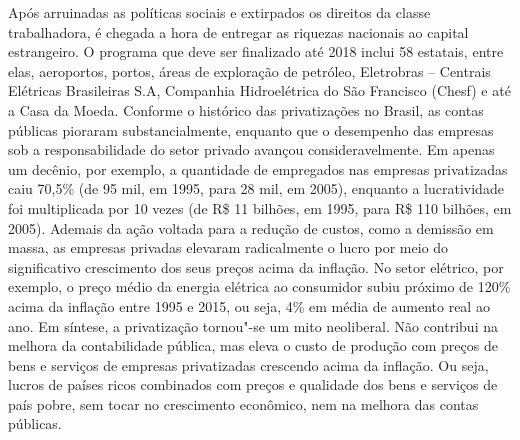Após arruinadas as políticas sociais e extirpados os direitos da classe
trabalhadora, é chegada a hora de entregar as riquezas nacionais ao
capital estrangeiro. O programa que deve ser finalizado até 2018 inclui
58 estatais, entre elas, aeroportos, portos, áreas de exploração de
petróleo, Eletrobras -- Centrais Elétricas Brasileiras S.A, Companhia
Hidroelétrica do São Francisco (Chesf) e até a Casa da Moeda. Conforme o
histórico das privatizações no Brasil, as contas públicas pioraram
substancialmente, enquanto que o desempenho das empresas sob a
responsabilidade do setor privado avançou consideravelmente. Em apenas
um decênio, por exemplo, a quantidade de empregados nas empresas
privatizadas caiu 70,5\% (de 95 mil, em 1995, para 28 mil, em 2005),
enquanto a lucratividade foi multiplicada por 10 vezes (de R\$ 11
bilhões, em 1995, para R\$ 110 bilhões, em 2005). Ademais da ação
voltada para a redução de custos, como a demissão em massa, as empresas
privadas elevaram radicalmente o lucro por meio do significativo
crescimento dos seus preços acima da inflação. No setor elétrico, por
exemplo, o preço médio da energia elétrica ao consumidor subiu próximo
de 120\% acima da inflação entre 1995 e 2015, ou seja, 4\% em média de
aumento real ao ano. Em síntese, a privatização tornou"-se um mito
neoliberal. Não contribui na melhora da contabilidade pública, mas eleva
o custo de produção com preços de bens e serviços de empresas
privatizadas crescendo acima da inflação. Ou seja, lucros de países
ricos combinados com preços e qualidade dos bens e serviços de país
pobre, sem tocar no crescimento econômico, nem na melhora das contas
públicas.

